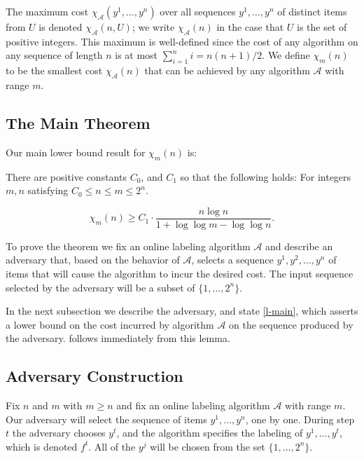 \documentclass[unicode,review]{siamart1116}
\newcommand{\A}{\mathcal{A}}
\newcommand{\thmA}{{C_0}}
\newcommand{\thmB}{{C_1}}
\numberwithin{theorem}{section}
\begin{document}
 
The maximum cost
$\chi_\A(y^1,\dotsc,y^n)$ over all sequences $y^1,\dotsc,y^n$ of distinct items from $U$  is denoted $\chi_\A(n,U)$;
we write $\chi_\A(n)$ in the case that $U$ is the set of positive integers.
This maximum  is well-defined since the cost of any algorithm on any sequence of length $n$ is at most $\sum_{i=1}^n i = n(n+1)/2$.    
We define $\chi_m(n)$ to be the smallest cost $\chi_\A(n)$ that
can be achieved by any algorithm $\A$ with range $m$.

\subsection{The Main Theorem}
\label{subsec:main theorem}
Our main lower bound result for  $\chi_m(n)$ is:

\begin{theorem}
\label{thm:main}
There are positive constants $\thmA$, and $\thmB$ so that the following holds: For integers $m,n$ satisfying
$\thmA \leq n \le m \le 2^{n}$.


$$\chi_m(n) \geq   \thmB \cdot \frac{n \log n}{1 + \log \log m - \log \log n}.$$

\end{theorem}


To prove the theorem we fix an online labeling algorithm $\A$ and describe an adversary that, based on the 
behavior of $\A$, selects a sequence $y^1,y^2,\dotsc,y^n$ of items that will cause
the algorithm to incur the desired cost.  The input sequence selected by the adversary will be a subset of
$\{1,\ldots,2^n\}$.

 In the next subsection we  describe the adversary,
and state \cref{l-main}, which asserts a lower bound on the cost incurred
by algorithm $\A$ on  the sequence produced by the adversary.  follows
immediately from this lemma.

\subsection{Adversary Construction}
\label{ss-adversary}

 Fix $n$ and $m$ with $m\ge n$  and 
fix an online labeling algorithm $\A$ with range $m$.  Our adversary will select 
the sequence of items $y^1,\dotsc,y^n$, one by one.    During step $t$  the adversary chooses $y^t$,
and the algorithm specifies the labeling of $y^1,\ldots,y^t$, which is denoted $f^t$.  All of the $y^j$ will be chosen
from the set $\{1,\ldots,2^{n}\}$.
 
\end{document}
